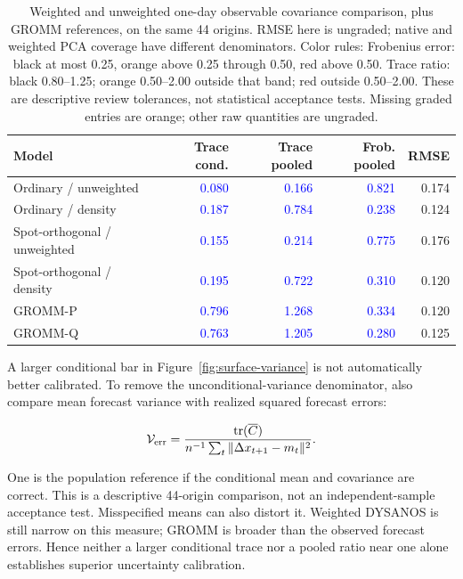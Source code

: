 \documentclass[11pt]{article}
\begin{document}
\begin{table}[H]\centering\small\setlength{\tabcolsep}{4pt}
\caption{Weighted and unweighted one-day observable covariance comparison, plus GROMM references, on the same 44 origins. RMSE here is ungraded; native and weighted PCA coverage have different denominators. Color rules: Frobenius error: black at most 0.25, orange above 0.25 through 0.50, red above 0.50. Trace ratio: black 0.80--1.25; orange 0.50--2.00 outside that band; red outside 0.50--2.00. These are descriptive review tolerances, not statistical acceptance tests. Missing graded entries are orange; other raw quantities are ungraded.}\label{tab:density-covariance}
\begin{tabular}{@{}lrrrr@{}}
\toprule
Model & Trace cond. & Trace pooled & Frob. pooled & RMSE \\
\midrule
Ordinary / unweighted & \textcolor{blue}{0.080} & \textcolor{blue}{0.166} & \textcolor{blue}{0.821} & 0.174 \\
Ordinary / density & \textcolor{blue}{0.187} & \textcolor{blue}{0.784} & \textcolor{blue}{0.238} & 0.124 \\
Spot-orthogonal / unweighted & \textcolor{blue}{0.155} & \textcolor{blue}{0.214} & \textcolor{blue}{0.775} & 0.176 \\
Spot-orthogonal / density & \textcolor{blue}{0.195} & \textcolor{blue}{0.722} & \textcolor{blue}{0.310} & 0.120 \\
GROMM-P & \textcolor{blue}{0.796} & \textcolor{blue}{1.268} & \textcolor{blue}{0.334} & 0.120 \\
GROMM-Q & \textcolor{blue}{0.763} & \textcolor{blue}{1.205} & \textcolor{blue}{0.280} & 0.125 \\
\bottomrule\end{tabular}\end{table}

A larger conditional bar in Figure~\ref{fig:surface-variance} is not automatically better calibrated. To remove the unconditional-variance denominator, also compare mean forecast variance with realized squared forecast errors:

\[\mathcal V_{\rm err}=\frac{\operatorname{tr}(\overline C)}{n^{-1}\sum_t\|\Delta x_{t+1}-m_t\|^2}.\]

One is the population reference if the conditional mean and covariance are correct. This is a descriptive 44-origin comparison, not an independent-sample acceptance test. Misspecified means can also distort it. Weighted DYSANOS is still narrow on this measure; GROMM is broader than the observed forecast errors. Hence neither a larger conditional trace nor a pooled ratio near one alone establishes superior uncertainty calibration.
\end{document}
